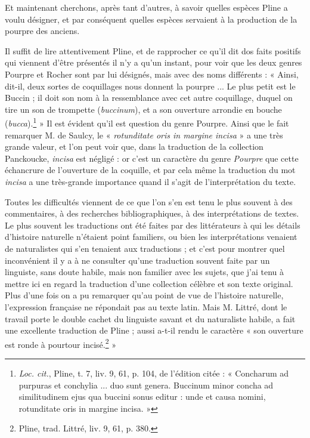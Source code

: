 \documentclass[a4paper, 11pt, oneside, polutonikogreek, french]{article}
\begin{document}
Et maintenant cherchons, après tant d'autres, à savoir quelles espèces Pline a voulu désigner, et par conséquent quelles espèces servaient à la production de la pourpre des anciens.

Il suffit de lire attentivement Pline, et de rapprocher ce qu'il dit dos faits positifs qui viennent d'être présentés il n'y a qu'un instant, pour voir que les deux genres Pourpre et Rocher sont par lui désignés, mais avec des noms différents : « Ainsi, dit-il, deux sortes de coquillages nous donnent la pourpre ... Le plus petit est le Buccin ; il doit son nom à la ressemblance avec cet autre coquillage, duquel on tire un son de trompette (\emph{buccinum}), et a son ouverture arrondie en bouche (\emph{bucca}).\footnote{\emph{Loc. cit.}, Pline, t. 7, liv. 9, 61, p. 104, de l'édition citée : « Concharum ad purpuras et conchylia ... duo sunt genera. Buccinum minor concha ad similitudinem ejus qua buccini sonus editur : unde et causa nomini, rotunditate oris in margine incisa. »} » Il est évident qu'il est question du genre Pourpre. Ainsi que le fait remarquer M. de Saulcy, le « \emph{rotunditate oris in margine incisa} » a une très grande valeur, et l'on peut voir que, dans la traduction de la collection Panckoucke, \emph{incisa} est négligé : or c'est un caractère du genre \emph{Pourpre} que cette échancrure de l'ouverture de la coquille, et par cela même la traduction du mot \emph{incisa} a une très-grande importance quand il s'agit de l'interprétation du texte.

Toutes les difficultés viennent de ce que l'on s'en est tenu le plus souvent à des commentaires, à des recherches bibliographiques, à des interprétations de textes. Le plus souvent les traductions ont été faites par des littérateurs à qui les détails d'histoire naturelle n'étaient point familiers, ou bien les interprétations venaient de naturalistes qui s'en tenaient aux traductions ; et c'est pour montrer quel inconvénient il y a à ne consulter qu'une traduction souvent faite par un linguiste, sans doute habile, mais non familier avec les sujets, que j'ai tenu à mettre ici en regard la traduction d'une collection célèbre et son texte original. Plus d'une fois on a pu remarquer qu'au point de vue de l'histoire naturelle, l'expression française ne répondait pas au texte latin. Mais M. Littré, dont le travail porte le double cachet du linguiste savant et du naturaliste habile, a fait une excellente traduction de Pline ; aussi a-t-il rendu le caractère « son ouverture est ronde à pourtour incisé.\footnote{Pline, trad. Littré, liv. 9, 61, p. 380.} »
\end{document}
